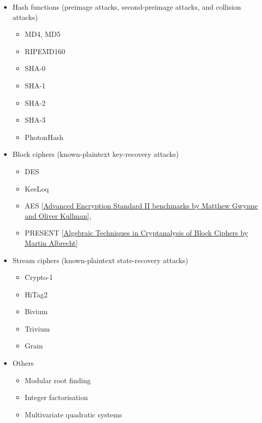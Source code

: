 \documentclass[12pt, a4paper]{article}
\begin{document}
\begin{itemize}
\item Hash functions (preimage attacks, second-preimage attacks, and collision attacks)
\begin{itemize}
\item MD4, MD5~\cite{Jova2005, Miro2006, De2007}
\item RIPEMD160
\item SHA-0~\cite{Miro2006}
\item SHA-1~\cite{Mora2010}
\item SHA-2
\item SHA-3~\cite{Mora2010}
\item PhotonHash
\end{itemize}

\item Block ciphers (known-plaintext key-recovery attacks)
\begin{itemize}
\item DES~\cite{Massacci2000, Courtois2007}
\item KeeLoq~\cite{Cour2008}
\item AES [\href{cs.swan.ac.uk/~csmg/Hardness/2012_SAT_AESBenchmarks.pdf}{Advanced Encryption Standard II benchmarks by Matthew Gwynne and Oliver Kullman}], \cite{DBLP:conf/ches/RenauldSV09}

\item PRESENT [\href{https://www.cosic.esat.kuleuven.be/ecrypt/courses/albena11/slides/martin_albrecht_algebraic_cryptanalysis.pdf}{Algebraic Techniques in Cryptanalysis
of Block Ciphers by Martin Albrecht}]


\end{itemize}

\item Stream ciphers (known-plaintext state-recovery attacks)
\begin{itemize}
\item Crypto-1~\cite{Soos2009}
\item HiTag2~\cite{Soos2009}
\item Bivium~\cite{Eibach:2008:ABU:1789854.1789861,Soos2009, McDonald2010}
\item Trivium~\cite{Eibach:2008:ABU:1789854.1789861,Soos2009, McDonald2010}
\item Grain~\cite{Soos2010}
\end{itemize}

\item Others
\begin{itemize}
\item Modular root finding~\cite{Fiorini2003}
\item Integer factorisation~\cite{Sreb2007}
\item Multivariate quadratic systems~\cite{Bard2007}
\end{itemize}
\end{itemize}
\end{document}
